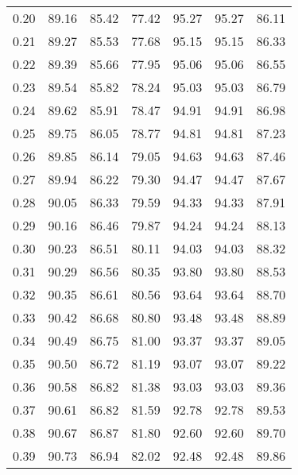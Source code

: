 \begin{tabular}{|c|c|c|c|c|c|c|}
      0.20 &     89.16 &     85.42 &      77.42 &   95.27 &      95.27 &         86.11 \\
      0.21 &     89.27 &     85.53 &      77.68 &   95.15 &      95.15 &         86.33 \\
      0.22 &     89.39 &     85.66 &      77.95 &   95.06 &      95.06 &         86.55 \\
      0.23 &     89.54 &     85.82 &      78.24 &   95.03 &      95.03 &         86.79 \\
      0.24 &     89.62 &     85.91 &      78.47 &   94.91 &      94.91 &         86.98 \\
      0.25 &     89.75 &     86.05 &      78.77 &   94.81 &      94.81 &         87.23 \\
      0.26 &     89.85 &     86.14 &      79.05 &   94.63 &      94.63 &         87.46 \\
      0.27 &     89.94 &     86.22 &      79.30 &   94.47 &      94.47 &         87.67 \\
      0.28 &     90.05 &     86.33 &      79.59 &   94.33 &      94.33 &         87.91 \\
      0.29 &     90.16 &     86.46 &      79.87 &   94.24 &      94.24 &         88.13 \\
      0.30 &     90.23 &     86.51 &      80.11 &   94.03 &      94.03 &         88.32 \\
      0.31 &     90.29 &     86.56 &      80.35 &   93.80 &      93.80 &         88.53 \\
      0.32 &     90.35 &     86.61 &      80.56 &   93.64 &      93.64 &         88.70 \\
      0.33 &     90.42 &     86.68 &      80.80 &   93.48 &      93.48 &         88.89 \\
      0.34 &     90.49 &     86.75 &      81.00 &   93.37 &      93.37 &         89.05 \\
      0.35 &     90.50 &     86.72 &      81.19 &   93.07 &      93.07 &         89.22 \\
      0.36 &     90.58 &     86.82 &      81.38 &   93.03 &      93.03 &         89.36 \\
      0.37 &     90.61 &     86.82 &      81.59 &   92.78 &      92.78 &         89.53 \\
      0.38 &     90.67 &     86.87 &      81.80 &   92.60 &      92.60 &         89.70 \\
      0.39 &     90.73 &     86.94 &      82.02 &   92.48 &      92.48 &         89.86 \\

\end{tabular}
